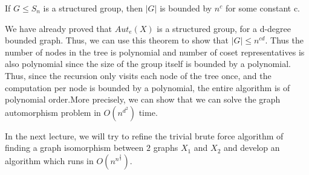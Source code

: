 \begin{theorem}
If $G \leqslant S_{n}$ is a structured group, then $|G|$ is bounded by $n^{c}$  for some constant c.
\end{theorem}

We have already proved that $Aut_{e}(X)$ is a structured group, for a d-degree bounded graph. Thus, we can use this theorem to show that $|G| \leq n^{cd}$. Thus the number of nodes in the tree is polynomial and number of coset representatives is also polynomial since the size of the group itself is bounded by a polynomial. Thus, since the recursion only visits each node of the tree once, and the computation per node is bounded by a polynomial, the entire algorithm is of polynomial order.More precisely, we can show that we can solve the graph automorphism problem in $O(n^{d^{2}})$ time.

In the next lecture, we will try to refine the trivial brute force algorithm of finding a graph isomorphism between $2$ graphs $X_{1}$ and $X_{2}$ and develop an algorithm which runs in $O(n^{n^{\frac{2}{3}}})$.

